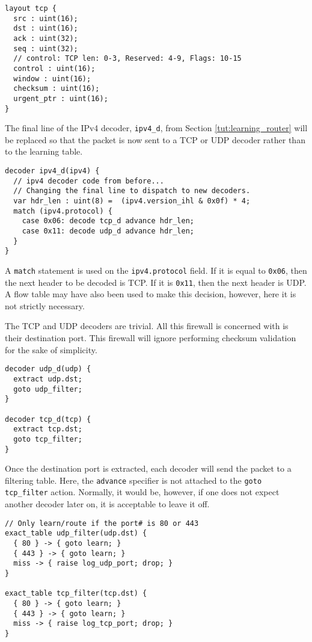 \begin{lstlisting}
layout tcp {
  src : uint(16);
  dst : uint(16);
  ack : uint(32);
  seq : uint(32);
  // control: TCP len: 0-3, Reserved: 4-9, Flags: 10-15
  control : uint(16); 
  window : uint(16);
  checksum : uint(16);
  urgent_ptr : uint(16);
}
\end{lstlisting}

The final line of the IPv4 decoder, \texttt{ipv4\_d}, from Section \ref{tut:learning_router} will be replaced so that the packet is now sent to a TCP or UDP decoder rather than to the learning table.

\begin{lstlisting}
decoder ipv4_d(ipv4) {
  // ipv4 decoder code from before...
  // Changing the final line to dispatch to new decoders.
  var hdr_len : uint(8) =  (ipv4.version_ihl & 0x0f) * 4;
  match (ipv4.protocol) {
    case 0x06: decode tcp_d advance hdr_len;
    case 0x11: decode udp_d advance hdr_len;
  }
}
\end{lstlisting}

A \texttt{match} statement is used on the \texttt{ipv4.protocol} field. If it is equal to \texttt{0x06}, then the next header to be decoded is TCP. If it is \texttt{0x11}, then the next header is UDP. A flow table may have also been used to make this decision, however, here it is not strictly necessary.

The TCP and UDP decoders are trivial. All this firewall is concerned with is their destination port. This firewall will ignore performing checksum validation for the sake of simplicity. 

\begin{lstlisting}
decoder udp_d(udp) {
  extract udp.dst;
  goto udp_filter;
}

decoder tcp_d(tcp) {
  extract tcp.dst;
  goto tcp_filter;
}
\end{lstlisting}

Once the destination port is extracted, each decoder will send the packet to 
a filtering table. Here, the \texttt{advance} specifier is not attached to the 
\texttt{goto tcp\_filter} action. Normally, it would be, however, if one does 
not expect another decoder later on, it is acceptable to leave it off.

\begin{lstlisting}
// Only learn/route if the port# is 80 or 443
exact_table udp_filter(udp.dst) {
  { 80 } -> { goto learn; }
  { 443 } -> { goto learn; }
  miss -> { raise log_udp_port; drop; }
}

exact_table tcp_filter(tcp.dst) {
  { 80 } -> { goto learn; }
  { 443 } -> { goto learn; }
  miss -> { raise log_tcp_port; drop; }
}
\end{lstlisting}

